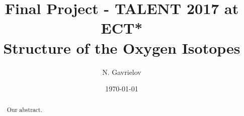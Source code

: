 \documentclass[aps,prl,reprint,groupedaddress]{revtex4-1}  %
\begin{document}
\title{Final Project - TALENT 2017 at ECT* \\
		\small Structure of the Oxygen Isotopes}


\author{N. Gavrielov}
\affiliation{}


\date{\today}

\begin{abstract}
Our abstract.
\end{abstract}

\pacs{}

\maketitle

\newpage







\newpage
\appendix
\onecolumngrid

\newpage

\end{document}
